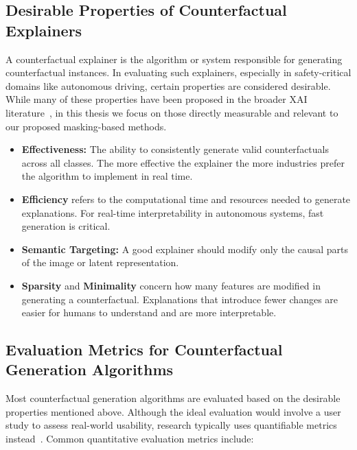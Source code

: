 \subsection{Desirable Properties of Counterfactual Explainers}
A counterfactual explainer is the algorithm or system responsible for generating counterfactual instances. In evaluating such explainers, especially in safety-critical domains like autonomous driving, certain properties are considered desirable. While many of these properties have been proposed in the broader XAI literature~\cite{guidotti2022counterfactual, DELANEY2023103995}, in this thesis we focus on those directly measurable and relevant to our proposed masking-based methods.

\begin{itemize}
    \item \textbf{Effectiveness:} The ability to consistently generate valid counterfactuals across all classes. The more effective the explainer the more industries prefer the algorithm to implement in real time.

    \item \textbf{Efficiency} refers to the computational time and resources needed to generate explanations. For real-time interpretability in autonomous systems, fast generation is critical.

    \item \textbf{Semantic Targeting:} A good explainer should modify only the causal parts of the image or latent representation.

    \item \textbf{Sparsity} and \textbf{Minimality} concern how many features are modified in generating a counterfactual. Explanations that introduce fewer changes are easier for humans to understand and are more interpretable.
\end{itemize}

\subsection{Evaluation Metrics for Counterfactual Generation Algorithms}
Most counterfactual generation algorithms are evaluated based on the desirable properties mentioned above. Although the ideal evaluation would involve a user study to assess real-world usability, research typically uses quantifiable metrics instead~\cite{Singh1622975, DBLP:journals/corr/abs-2010-10596, wang2024counterfactual}. Common quantitative evaluation metrics include:

